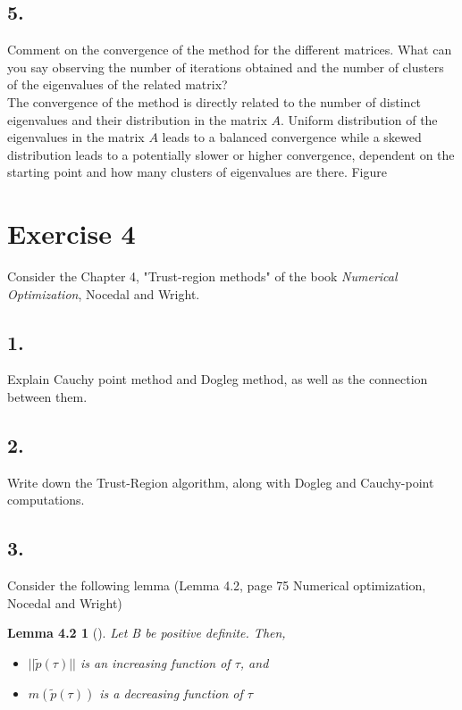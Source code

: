 \documentclass[unicode,11pt,a4paper,oneside,numbers=endperiod,openany]{scrartcl}
\newcommand{\mytheorem}[5]{\newtheorem*{#1}{#2} \begin{#1}[#3]\label{#4} #5 \end{#1}}
\begin{document}
\subsection*{5.}
Comment on the convergence of the method for the different matrices.
What can you say observing the number of iterations obtained
and the number of clusters of the eigenvalues of the related matrix?\\

The convergence of the method is directly related to the number of distinct eigenvalues
and their distribution in the matrix $A$.
Uniform distribution of the eigenvalues in the matrix $A$ leads to a balanced convergence
while a skewed distribution leads to a potentially slower or higher convergence,
dependent on the starting point and how many clusters of eigenvalues are there.
Figure %

\section*{Exercise 4}
Consider the Chapter 4, "Trust-region methods" of the book \textit{Numerical Optimization},
Nocedal and Wright.

\subsection*{1.}
Explain  Cauchy point method and Dogleg method, as well as the connection between them.

\subsection*{2.}
Write down the Trust-Region algorithm, along with Dogleg and Cauchy-point computations.

\subsection*{3.}
Consider the following lemma (Lemma 4.2, page 75 Numerical optimization, Nocedal and Wright)

\mytheorem{lemma}{Lemma 4.2}{}{lemma:4.2}{
    Let B be positive definite. Then,
    \begin{itemize}
        \item[(a)] $|| \tilde{p}(\tau) ||$ is an increasing function of $\tau$, and
        \item[(b)] $m(\tilde{p}(\tau))$ is a decreasing function of $\tau$
    \end{itemize}
}
\end{document}
